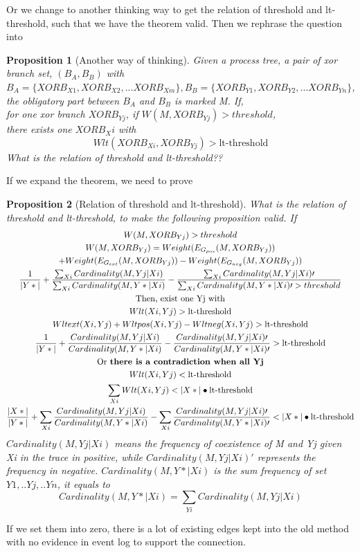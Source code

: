 \documentclass[]{article}
\newtheorem{myproposition}{Proposition}[section]
\begin{document}
Or we change to another thinking way to get the relation of threshold and lt-threshold, such that we have the theorem valid. Then we rephrase the question into
\begin{myproposition}[Another way of thinking]
	Given a process tree, a pair of xor branch set, $(B_A,B_B)$ with $B_A=\{XORB_{X1}, XORB_{X2},...XORB_{Xm}\}, B_B=\{XORB_{Y1}, XORB_{Y2},...XORB_{Yn}\}$, the obligatory part between $B_A$ and $B_B$ is marked M. If,\\
	for one xor branch $XORB_{Yj}$, if $W(M, XORB_{Yj}) > threshold$, \\ there exists one $XORB_Xi$ with 
	\[Wlt(XORB_{Xi}, XORB_{Yj})> \text{lt-threshold}\]
	What is the relation of threshold and lt-threshold?? 
\end{myproposition}
If we expand the theorem, we need to prove 
\begin{myproposition}[Relation of threshold and lt-threshold]
	What is the relation of threshold and lt-threshold, to make the following proposition valid. If 
	\begin{equation*}
	 \begin{gathered}
		W(M, XORB_{Yj})  > threshold \\
	W(M, XORB_{Yj}) = Weight(E_{G_{pos}}(M, XORB_{Yj})) \\
	+ Weight(E_{G_{ext}}(M, XORB_{Yj})) 
	- Weight(E_{G_{neg}}(M, XORB_{Yj})) \\
	\frac{1}{|Y*|} + \frac{\sum_{Xi}{Cardinality(M,Yj|Xi)}} {\sum_{Xi}{Cardinality(M,Y*|Xi)}}  
	- \frac{\sum_{Xi}{Cardinality(M,Yj|Xi)\prime}} {\sum_{Xi}{Cardinality(M,Y*|Xi)\prime} > threshold} \\
	\text{Then, exist one Yj with}\\
	Wlt(Xi, Yj)> \text{lt-threshold} \\
	Wlt{ext}(Xi, Yj) + Wlt{pos}(Xi, Yj) -Wlt{neg}(Xi, Yj) > \text{lt-threshold}\\
	\frac{1}{|Y*|} + \frac{Cardinality(M,Yj|Xi)} {Cardinality(M,Y*|Xi)}  
	- \frac{Cardinality(M,Yj|Xi)\prime} {Cardinality(M,Y*|Xi)\prime} > \text{lt-threshold}  \\
	\text{Or \textbf{there is a contradiction when all Yj}}\\
	Wlt(Xi, Yj)< \text{lt-threshold}\\
	\sum_{Xi} Wlt(Xi, Yj) < |X*|\bullet \text{lt-threshold} \\
	\frac{|X*|}{|Y*|} + \sum_{Xi}\frac{Cardinality(M,Yj|Xi)} {Cardinality(M,Y*|Xi)}  
	- \sum_{Xi}\frac{Cardinality(M,Yj|Xi)\prime} {Cardinality(M,Y*|Xi)\prime} < |X*|\bullet \text{lt-threshold}  \\
	 \end{gathered}
	\end{equation*}	
$Cardinality(M,Yj|Xi)$ means the frequency of coexistence of M and Yj given Xi in the trace in positive, while $Cardinality(M,Yj|Xi)\prime$ represents the frequency in negative. $Cardinality(M,Y*|Xi)$ is the sum frequency of set ${Y1,..Yj,..Yn}$, it equals to \[Cardinality(M,Y*|Xi) = \sum_{Yi}Cardinality(M,Yj|Xi)\]
\end{myproposition}
If we set them into zero, there is a lot of existing edges kept into the old method with no evidence in event log to support the connection. 
\end{document}

